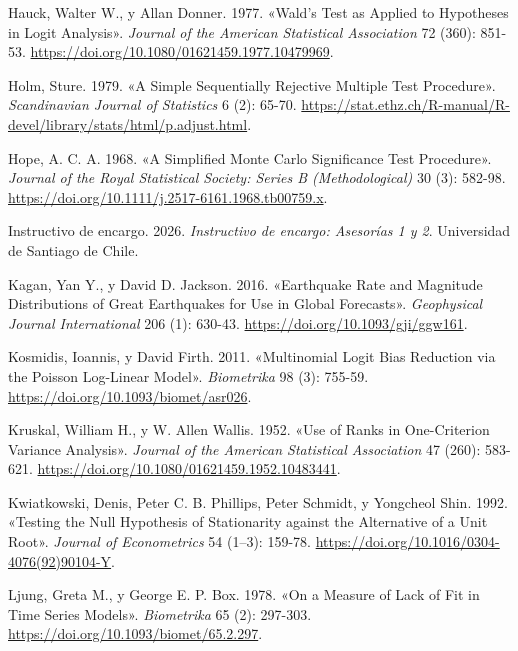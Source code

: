 \documentclass[
  spanish,
  letterpaper,
  DIV=11,
  numbers=noendperiod]{scrartcl}
\newlength{\cslhangindent}
\newenvironment{CSLReferences}[2] %
 {\begin{list}{}{%
  \setlength{\itemindent}{0pt}
  \setlength{\leftmargin}{0pt}
  \setlength{\parsep}{0pt}
  \ifodd #1
   \setlength{\leftmargin}{\cslhangindent}
   \setlength{\itemindent}{-1\cslhangindent}
  \fi
  \setlength{\itemsep}{#2\baselineskip}}}
 {\end{list}}
\begin{document}
\begin{CSLReferences}{1}{1}
Hauck, Walter W., y Allan Donner. 1977. {«Wald's Test as Applied to
Hypotheses in Logit Analysis»}. \emph{Journal of the American
Statistical Association} 72 (360): 851-53.
\url{https://doi.org/10.1080/01621459.1977.10479969}.

Holm, Sture. 1979. {«A Simple Sequentially Rejective Multiple Test
Procedure»}. \emph{Scandinavian Journal of Statistics} 6 (2): 65-70.
\url{https://stat.ethz.ch/R-manual/R-devel/library/stats/html/p.adjust.html}.

Hope, A. C. A. 1968. {«A Simplified Monte Carlo Significance Test
Procedure»}. \emph{Journal of the Royal Statistical Society: Series B
(Methodological)} 30 (3): 582-98.
\url{https://doi.org/10.1111/j.2517-6161.1968.tb00759.x}.

Instructivo de encargo. 2026. \emph{Instructivo de encargo: Asesorías 1
y 2}. Universidad de Santiago de Chile.

Kagan, Yan Y., y David D. Jackson. 2016. {«Earthquake Rate and Magnitude
Distributions of Great Earthquakes for Use in Global Forecasts»}.
\emph{Geophysical Journal International} 206 (1): 630-43.
\url{https://doi.org/10.1093/gji/ggw161}.

Kosmidis, Ioannis, y David Firth. 2011. {«Multinomial Logit Bias
Reduction via the {Poisson} Log-Linear Model»}. \emph{Biometrika} 98
(3): 755-59. \url{https://doi.org/10.1093/biomet/asr026}.

Kruskal, William H., y W. Allen Wallis. 1952. {«Use of Ranks in
One-Criterion Variance Analysis»}. \emph{Journal of the American
Statistical Association} 47 (260): 583-621.
\url{https://doi.org/10.1080/01621459.1952.10483441}.

Kwiatkowski, Denis, Peter C. B. Phillips, Peter Schmidt, y Yongcheol
Shin. 1992. {«Testing the Null Hypothesis of Stationarity against the
Alternative of a Unit Root»}. \emph{Journal of Econometrics} 54 (1--3):
159-78. \url{https://doi.org/10.1016/0304-4076(92)90104-Y}.

Ljung, Greta M., y George E. P. Box. 1978. {«On a Measure of Lack of Fit
in Time Series Models»}. \emph{Biometrika} 65 (2): 297-303.
\url{https://doi.org/10.1093/biomet/65.2.297}.


\end{CSLReferences}
\end{document}
